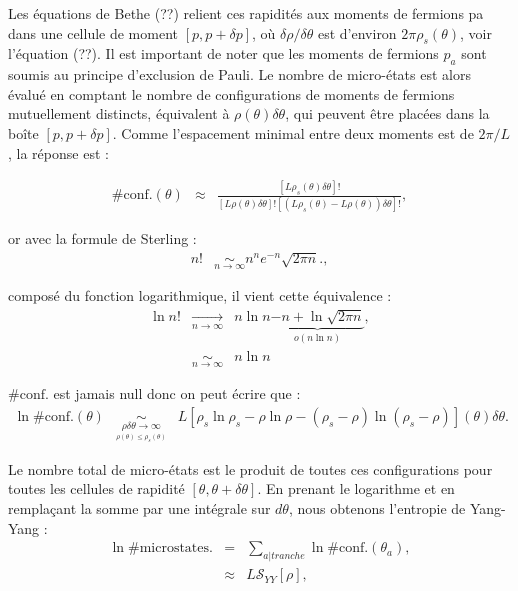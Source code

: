 Les équations de Bethe (??) relient ces rapidités aux moments de fermions pa dans une cellule de moment $[p, p+\delta p]$, où $\delta \rho/\delta \theta$ est d'environ $2\pi \rho_s(\theta)$, voir l'équation (??). Il est important de noter que les moments de fermions $p_a$ sont soumis au principe d'exclusion de Pauli. Le nombre de micro-états est alors évalué en comptant le nombre de configurations de moments de fermions mutuellement distincts, équivalent à $\rho (\theta)\delta \theta$, qui peuvent être placées dans la boîte $[p, p + \delta p]$. Comme l'espacement minimal entre deux moments est de $2\pi /L$, la réponse est :
	
	\begin{eqnarray}
		\# \mbox{conf.}(\theta) & \approx  & \frac{[ L\rho_s ( \theta ) \delta \theta ] ! }{ [ L\rho ( \theta ) \delta \theta ] ! [( L\rho_s ( \theta ) - L\rho ( \theta ) )  \delta \theta ] ! } , 	
	\end{eqnarray}
	
	or avec la formule de Sterling :  
	\begin{eqnarray}
		n! & \underset{n \to \infty}{\sim} n^n e^{-n} \sqrt{2\pi n}.,
	\end{eqnarray}
	
	composé du fonction logarithmique, il vient cette équivalence : 
	\begin{eqnarray}
		\ln n! & \underset{n \to \infty}{\rightarrow} & n \ln n \underbrace{- n + \ln \sqrt{2 \pi n }}_{o \left ( n \ln n \right ) } ,\\
		&  \underset{n \to \infty}{\sim} & n \ln n  
	\end{eqnarray}
	
	$\# \mbox{conf.}$ est jamais null donc on peut écrire que : 
\begin{eqnarray}
    \ln \# \mbox{conf.}(\theta) & \underset{\underset{\rho (\theta )\leq  \rho_s (\theta )}{\rho \delta \theta  \to \infty}}{\sim}   & L [ \rho_s\ln \rho_s - \rho \ln \rho - (\rho_s - \rho ) \ln ( \rho_s - \rho) ] (\theta )\delta \theta .
\end{eqnarray}

Le nombre total de micro-états est le produit de toutes ces configurations pour toutes les cellules de rapidité $[\theta, \theta + \delta \theta]$. En prenant le logarithme et en remplaçant la somme par une intégrale sur $d \theta$, nous obtenons l'entropie de Yang-Yang :
\begin{eqnarray}
    \ln \# \mbox{microstates.} & = & \sum_{a\vert tranche} \ln \# \mbox{conf.}(\theta_a), \\
    & \approx &   L\mathcal{S}_{YY} [ \rho ] , 	
\end{eqnarray}

